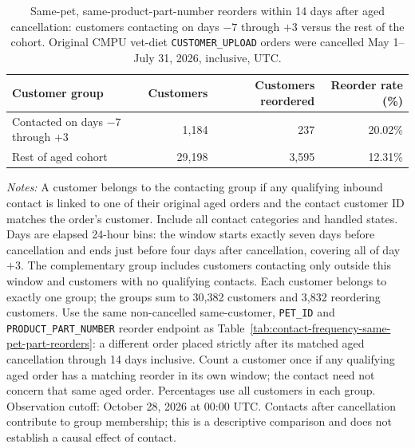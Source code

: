 \begin{table}[!htbp]
\centering
\caption{Same-pet, same-product-part-number reorders within 14 days after aged cancellation: customers contacting on days $-7$ through $+3$ versus the rest of the cohort. Original CMPU vet-diet \texttt{CUSTOMER\_UPLOAD} orders were cancelled May 1--July 31, 2026, inclusive, UTC.}
\label{tab:contact-window-same-pet-part-reorders}
\begin{tabular}{@{}lrrr@{}}
\toprule
Customer group & Customers & Customers reordered & Reorder rate (\%) \\
\midrule

Contacted on days $-7$ through $+3$ & 1,184 & 237 & 20.02\% \\

Rest of aged cohort & 29,198 & 3,595 & 12.31\% \\
\bottomrule
\end{tabular}

\begin{minipage}{\linewidth}
\footnotesize
\textit{Notes:} A customer belongs to the contacting group if any qualifying
inbound contact is linked to one of their original aged orders and the contact
customer ID matches the order's customer. Include all contact categories and
handled states. Days are elapsed 24-hour bins: the window starts exactly seven
days before cancellation and ends just before four days after cancellation,
covering all of day $+3$. The complementary group includes customers contacting
only outside this window and customers with no qualifying contacts. Each
customer belongs to exactly one group; the groups sum to 30,382 customers and
3,832 reordering customers. Use the same non-cancelled same-customer,
\texttt{PET\_ID} and \texttt{PRODUCT\_PART\_NUMBER} reorder endpoint as
Table~\ref{tab:contact-frequency-same-pet-part-reorders}: a different order
placed strictly after its matched aged cancellation through 14 days inclusive.
Count a customer once if any qualifying aged order has a matching reorder in
its own window; the contact need not concern that same aged order. Percentages
use all customers in each group. Observation cutoff: October 28, 2026 at 00:00
UTC. Contacts after cancellation contribute to group membership; this is a
descriptive comparison and does not establish a causal effect of contact.
\end{minipage}
\end{table}